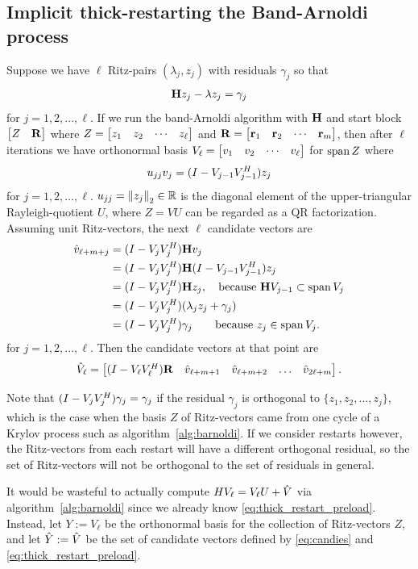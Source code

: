 \subsection{Implicit thick-restarting the Band-Arnoldi process} \label{sec:IRA_bArnoldi}
Suppose we have $\ell$ Ritz-pairs $(\lambda_j,z_j)$ with residuals $\gamma_j$ so that 
\[
\H z_j - \lambda z_j = \gamma_j
\]  
for $j=1,2,...,\ell$.
If we run the band-Arnoldi algorithm with $\H$ and start block $\mat{Z&\RR}$ where $Z=\mat{z_1&z_2&\cdots&z_\ell}$ and $\RR=\mat{\Rr_1&\Rr_2&\cdots&\Rr_m}$, then after $\ell$ iterations we have orthonormal basis $V_\ell=\mat{v_1&v_2&\cdots&v_\ell}$ for $\spn Z$ where 
\[
u_{jj} v_j = (I - V_{j-1}\c{V_{j-1}})z_j
\]    
for $j=1,2,\ldots,\ell$.  
$u_{jj}=\nrm{2}{z_j}\in\R$ is the diagonal element of the upper-triangular Rayleigh-quotient $U$, where $Z = V U$ can be regarded as a QR factorization.  Assuming unit Ritz-vectors, the next $\ell$ candidate vectors are
\begin{equation}
\begin{aligned}
\vh_{\ell+m+j} &= (I-V_j\c{V_j})\H v_j\\
&= (I-V_j\c{V_j})\H   (I - V_{j-1}\c{V_{j-1}})z_j\\
&=  (I-V_j\c{V_j})\H z_j, \quad\text{because } \H V_{j-1} \subset \spn V_j \\
&=   (I-V_j\c{V_j})(\lambda_j z_j + \gamma_j)\\
&= (I-V_j\c{V_j}) \gamma_j \qquad \text{because } z_j\in\spn V_j. 
\end{aligned}
\label{eq:candies}
\end{equation}
for $j=1,2,...,\ell$.
Then the  candidate vectors at that point are  
\begin{equation}
\Vh_\ell = \mat{(I - V_\ell\c{V_\ell})\RR & \vh_{\ell+m+1} & \vh_{\ell+m+2} & \ldots& \vh_{2\ell+m}}.
\label{eq:thick_restart_preload}
\end{equation}

Note that $(I-V_j\c{V_j}) \gamma_j = \gamma_j$ if the residual $\gamma_j$ is orthogonal to $\{z_1,z_2,...,z_j\}$, which is the case when the basis $Z$ of Ritz-vectors came from one cycle of a Krylov process such as algorithm~\ref{alg:barnoldi}.   If we consider restarts however, the Ritz-vectors from each restart will have a different orthogonal residual, so the set of  Ritz-vectors will not be orthogonal to the set of residuals in general. 

 It would be wasteful to actually compute $H V_\ell = V_\ell U + \Vh$ via algorithm~\ref{alg:barnoldi} since we already know \eqref{eq:thick_restart_preload}.   Instead, let $Y:=V_\ell$ be the orthonormal basis for the collection of Ritz-vectors $Z$, and let $\Yh:=\Vh$ be the set of  candidate vectors defined by \eqref{eq:candies} and \eqref{eq:thick_restart_preload}.

